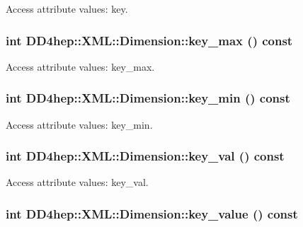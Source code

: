 Access attribute values: key. \hypertarget{struct_d_d4hep_1_1_x_m_l_1_1_dimension_a8e19f08463e37db22d911a8ee6092b30}{
\subsubsection[{key\_\-max}]{\setlength{\rightskip}{0pt plus 5cm}int DD4hep::XML::Dimension::key\_\-max () const}}
\label{struct_d_d4hep_1_1_x_m_l_1_1_dimension_a8e19f08463e37db22d911a8ee6092b30}


Access attribute values: key\_\-max. \hypertarget{struct_d_d4hep_1_1_x_m_l_1_1_dimension_a42e2e46f78454fca108e5df678823b96}{
\subsubsection[{key\_\-min}]{\setlength{\rightskip}{0pt plus 5cm}int DD4hep::XML::Dimension::key\_\-min () const}}
\label{struct_d_d4hep_1_1_x_m_l_1_1_dimension_a42e2e46f78454fca108e5df678823b96}


Access attribute values: key\_\-min. \hypertarget{struct_d_d4hep_1_1_x_m_l_1_1_dimension_a9f85c189d186a7504765f0ae4865db7e}{
\subsubsection[{key\_\-val}]{\setlength{\rightskip}{0pt plus 5cm}int DD4hep::XML::Dimension::key\_\-val () const}}
\label{struct_d_d4hep_1_1_x_m_l_1_1_dimension_a9f85c189d186a7504765f0ae4865db7e}


Access attribute values: key\_\-val. \hypertarget{struct_d_d4hep_1_1_x_m_l_1_1_dimension_a929488cb315a9c06e64fea6c236e5b7d}{
\subsubsection[{key\_\-value}]{\setlength{\rightskip}{0pt plus 5cm}int DD4hep::XML::Dimension::key\_\-value () const}}
\label{struct_d_d4hep_1_1_x_m_l_1_1_dimension_a929488cb315a9c06e64fea6c236e5b7d}


